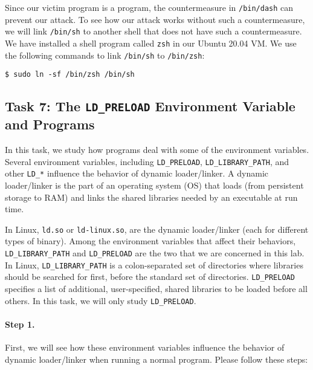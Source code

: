 Since our victim program is a \setuid program,
the countermeasure in \texttt{/bin/dash} can prevent our attack.
To see how our attack works without such a countermeasure,
we will link \texttt{/bin/sh} to another shell that does not
have such a countermeasure.  We have installed a shell program
called \texttt{zsh} in our Ubuntu 20.04 VM. We use the following
commands to link \texttt{/bin/sh} to \texttt{/bin/zsh}:

\begin{lstlisting}
$ sudo ln -sf /bin/zsh /bin/sh
\end{lstlisting}




\subsection{Task 7: The {\tt LD\_PRELOAD} Environment
Variable and \setuid Programs}


In this task, we study how \setuid programs deal
with some of the environment variables.
Several environment variables, including {\tt LD\_PRELOAD},
{\tt LD\_LIBRARY\_PATH}, and other {\tt LD\_*} influence the
behavior of dynamic loader/linker.
A dynamic loader/linker is the part of an operating system (OS) that
loads (from persistent storage to RAM) and links the shared libraries
needed by an executable at run time.

In Linux, {\tt ld.so} or {\tt ld-linux.so}, are the dynamic
loader/linker (each for different types of binary).
Among the environment variables that affect their behaviors,
{\tt LD\_LIBRARY\_PATH} and {\tt LD\_PRELOAD} are the two
that we are concerned in this lab.
In Linux, {\tt LD\_LIBRARY\_PATH} is a colon-separated set
of directories where libraries should be searched for first, before the
standard set of directories.
{\tt LD\_PRELOAD} specifies a list of additional, user-specified, shared libraries to
be loaded before all others. In this task, we will only
study {\tt LD\_PRELOAD}.


\paragraph{Step 1.}
First, we will see how these environment variables influence the
behavior of dynamic loader/linker when running a normal program.
Please follow these steps:


